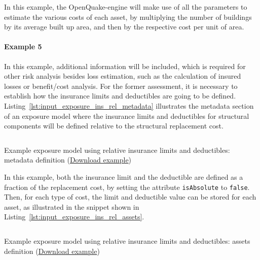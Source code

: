 In this example, the OpenQuake-engine will make use of all the parameters to
estimate the various costs of each asset, by multiplying the number of
buildings by its average built up area, and then by the respective cost per
unit of area.


\paragraph{Example 5}

In this example, additional information will be included, which is required
for other risk analysis besides loss estimation, such as the calculation of
insured losses or benefit/cost analysis. For the former assessment, it is
necessary to establish how the insurance limits and deductibles are going to
be defined. Listing~\ref{lst:input_exposure_ins_rel_metadata} illustrates the
metadata section of an exposure model where the insurance limits and
deductibles for structural components will be defined relative to the
structural replacement cost.

\begin{listing}[htbp]
  \inputminted[firstline=8,firstnumber=8,lastline=21,fontsize=\footnotesize,frame=single,linenos,bgcolor=lightgray]{xml}{oqum/risk/Verbatim/input_exposure_ins_rel.xml}
  \caption{Example exposure model using relative insurance limits and deductibles: metadata definition (\href{https://raw.githubusercontent.com/GEMScienceTools/oq-engine-docs/master/oqum/risk/verbatim/input_exposure_ins_rel.xml}{Download example})}
  \label{lst:input_exposure_ins_rel_metadata}
\end{listing}

In this example, both the insurance limit and the deductible are defined as a
fraction of the replacement cost, by setting the attribute \Verb+isAbsolute+
to \Verb+false+. Then, for each type of cost, the limit and deductible value
can be stored for each asset, as illustrated in the snippet shown in
Listing~\ref{lst:input_exposure_ins_rel_assets}.

\begin{listing}[htbp]
  \inputminted[firstline=22,firstnumber=22,lastline=32,fontsize=\footnotesize,frame=single,linenos,bgcolor=lightgray]{xml}{oqum/risk/Verbatim/input_exposure_ins_rel.xml}
  \caption{Example exposure model using relative insurance limits and deductibles: assets definition (\href{https://raw.githubusercontent.com/GEMScienceTools/oq-engine-docs/master/oqum/risk/verbatim/input_exposure_ins_rel.xml}{Download example})}
  \label{lst:input_exposure_ins_rel_assets}
\end{listing}

